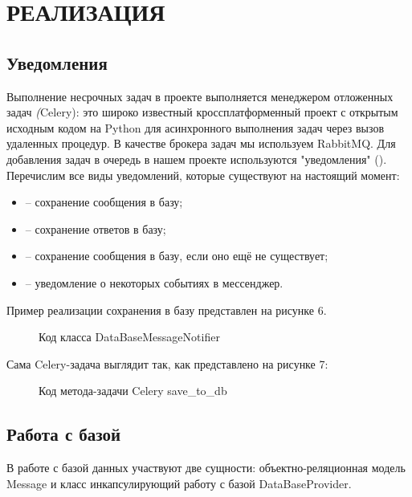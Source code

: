 \section{РЕАЛИЗАЦИЯ}
    \subsection{Уведомления}
    Выполнение несрочных задач в проекте выполняется менеджером отложенных задач \textit(Celery):
    это широко известный кроссплатформенный проект с открытым исходным кодом на Python для
    асинхронного выполнения задач через вызов удаленных процедур.
    В качестве брокера задач мы используем RabbitMQ\cite{docs.rabbitmq}.
    Для добавления задач в очередь в нашем проекте используются "уведомления" ().
    Перечислим все виды уведомлений, которые существуют на настоящий момент:
    \begin{itemize}
        \item {} -- сохранение сообщения в базу;
        \item {} -- сохранение ответов в базу;
        \item {} -- сохранение сообщения в базу, если оно ещё не существует;
        \item {} -- уведомление о некоторых событиях в мессенджер.
    \end{itemize}
    Пример реализации сохранения в базу представлен на рисунке 6.

    \begin{figure}[H]
        \centering
        
        \caption{Код класса DataBaseMessageNotifier}
        \label{fig:data_base_message_notifier}
    \end{figure}

    Сама Celery-задача выглядит так, как представлено на рисунке 7:

    \begin{figure}[H]
        \centering
        
        \caption{Код метода-задачи Celery save\_to\_db}
        \label{fig:celery_task}
    \end{figure}

    \subsection{Работа с базой}
    В работе с базой данных участвуют две сущности: объектно-реляционная модель Message
    и класс инкапсулирующий работу с базой DataBaseProvider.

